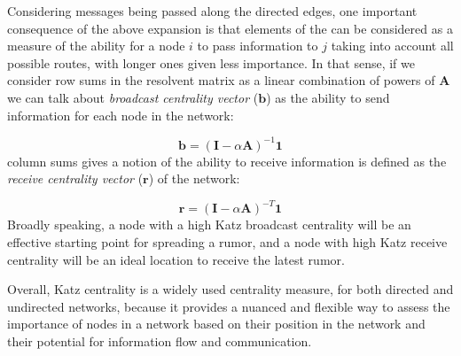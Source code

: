Considering messages being passed along the directed edges, one important consequence of the above expansion is that elements of the   can be considered as a measure of the ability for a node $i$ to pass information to $j$ taking into account all possible routes, with longer ones given less importance. In that sense, if we consider row sums in the resolvent matrix as a linear combination of powers of $\mathbf{A}$ we can talk about  \textit{broadcast centrality vector} ($\mathbf{b}$) as the ability to send information for each node in the network:  

\begin{equation}
\label{eqn:broad}
    \mathbf{b}=(\mathbf{I}-\alpha\mathbf{A})^{-1} \mathbf{1}
\end{equation}
  column sums  gives a notion of the ability to receive information is defined as the \textit{receive centrality vector} ($\mathbf{r}$) of the network:

\begin{equation}
\label{eqn:receiv}
    \mathbf{r} = (\mathbf{I}-\alpha\mathbf{A})^{-T} \mathbf{1}
\end{equation}
Broadly speaking, a node with a high Katz broadcast centrality will be an effective starting point for spreading a rumor, and a node with high Katz receive centrality will be an ideal location to receive the latest rumor.

Overall, Katz centrality is a widely used centrality measure, for both directed and undirected networks, because it provides a nuanced and flexible way to assess the importance of nodes in a network based on their position in the network and their potential for information flow and communication.

